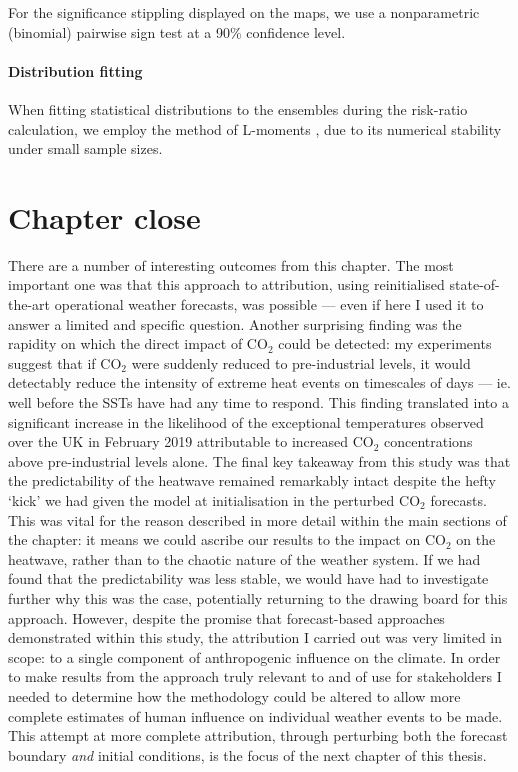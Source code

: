       For the significance stippling displayed on the maps, we use a nonparametric (binomial) pairwise sign test at a 90\% confidence level.

    \paragraph{Distribution fitting}

      When fitting statistical distributions to the ensembles during the risk-ratio calculation, we employ the method of L-moments \citep{hosking_l-moments_1990}, due to its numerical stability under small sample sizes.

\section{Chapter close}

  There are a number of interesting outcomes from this chapter. The most important one was that this approach to attribution, using reinitialised state-of-the-art operational weather forecasts, was possible --- even if here I used it to answer a limited and specific question. Another surprising finding was the rapidity on which the direct impact of CO$_2$ could be detected: my experiments suggest that if CO$_2$ were suddenly reduced to pre-industrial levels, it would detectably reduce the intensity of extreme heat events on timescales of days --- ie. well before the SSTs have had any time to respond. This finding translated into a significant increase in the likelihood of the exceptional temperatures observed over the UK in February 2019 attributable to increased CO$_2$ concentrations above pre-industrial levels alone. The final key takeaway from this study was that the predictability of the heatwave remained remarkably intact despite the hefty `kick' we had given the model at initialisation in the perturbed CO$_2$ forecasts. This was vital for the reason described in more detail within the main sections of the chapter: it means we could ascribe our results to the impact on CO$_2$ on the heatwave, rather than to the chaotic nature of the weather system. If we had found that the predictability was less stable, we would have had to investigate further why this was the case, potentially returning to the drawing board for this approach. However, despite the promise that forecast-based approaches demonstrated within this study, the attribution I carried out was very limited in scope: to a single component of anthropogenic influence on the climate. In order to make results from the approach truly relevant to and of use for stakeholders I needed to determine how the methodology could be altered to allow more complete estimates of human influence on individual weather events to be made. This attempt at more complete attribution, through perturbing both the forecast boundary \emph{and} initial conditions, is the focus of the next chapter of this thesis.